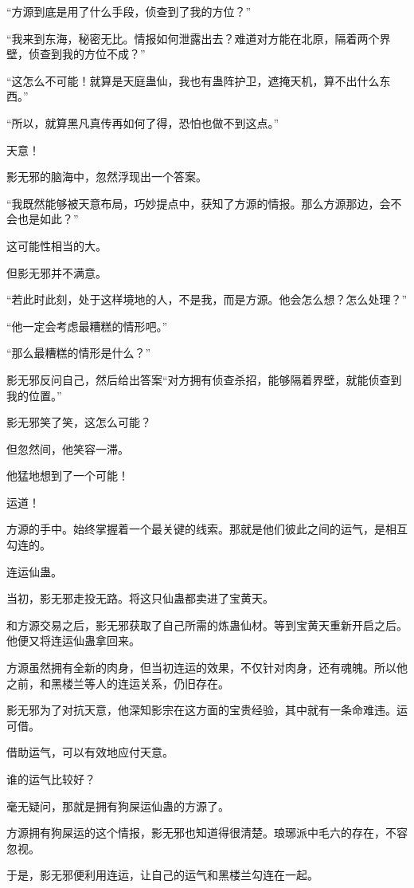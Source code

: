 \begin{this_body}
“方源到底是用了什么手段，侦查到了我的方位？”

“我来到东海，秘密无比。情报如何泄露出去？难道对方能在北原，隔着两个界壁，侦查到我的方位不成？”

“这怎么不可能！就算是天庭蛊仙，我也有蛊阵护卫，遮掩天机，算不出什么东西。”

“所以，就算黑凡真传再如何了得，恐怕也做不到这点。”

天意！

影无邪的脑海中，忽然浮现出一个答案。

“我既然能够被天意布局，巧妙提点中，获知了方源的情报。那么方源那边，会不会也是如此？”

这可能性相当的大。

但影无邪并不满意。

“若此时此刻，处于这样境地的人，不是我，而是方源。他会怎么想？怎么处理？”

“他一定会考虑最糟糕的情形吧。”

“那么最糟糕的情形是什么？”

影无邪反问自己，然后给出答案“对方拥有侦查杀招，能够隔着界壁，就能侦查到我的位置。”

影无邪笑了笑，这怎么可能？

但忽然间，他笑容一滞。

他猛地想到了一个可能！

运道！

方源的手中。始终掌握着一个最关键的线索。那就是他们彼此之间的运气，是相互勾连的。

连运仙蛊。

当初，影无邪走投无路。将这只仙蛊都卖进了宝黄天。

和方源交易之后，影无邪获取了自己所需的炼蛊仙材。等到宝黄天重新开启之后。他便又将连运仙蛊拿回来。

方源虽然拥有全新的肉身，但当初连运的效果，不仅针对肉身，还有魂魄。所以他之前，和黑楼兰等人的连运关系，仍旧存在。

影无邪为了对抗天意，他深知影宗在这方面的宝贵经验，其中就有一条命难违。运可借。

借助运气，可以有效地应付天意。

谁的运气比较好？

毫无疑问，那就是拥有狗屎运仙蛊的方源了。

方源拥有狗屎运的这个情报，影无邪也知道得很清楚。琅琊派中毛六的存在，不容忽视。

于是，影无邪便利用连运，让自己的运气和黑楼兰勾连在一起。


\end{this_body}
